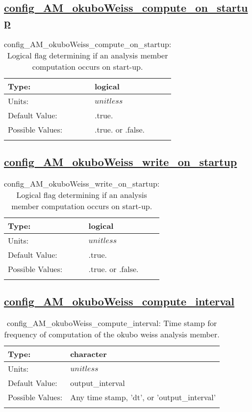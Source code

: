 \subsection[config\_AM\_okuboWeiss\_compute\_on\_startup]{\hyperref[sec:nm_tab_AM_okuboWeiss]{config\_AM\_okuboWeiss\_compute\_on\_startup}}
\label{subsec:nm_sec_config_AM_okuboWeiss_compute_on_startup}
\begin{center}
\begin{longtable}{| p{2.0in} || p{4.0in} |}
    \hline
    Type: & logical \\
    \hline
    Units: & $unitless$ \\
    \hline
    Default Value: & .true. \\
    \hline
    Possible Values: & .true. or .false. \\
    \hline
    \caption{config\_AM\_okuboWeiss\_compute\_on\_startup: Logical flag determining if an analysis member computation occurs on start-up.}
\end{longtable}
\end{center}
\subsection[config\_AM\_okuboWeiss\_write\_on\_startup]{\hyperref[sec:nm_tab_AM_okuboWeiss]{config\_AM\_okuboWeiss\_write\_on\_startup}}
\label{subsec:nm_sec_config_AM_okuboWeiss_write_on_startup}
\begin{center}
\begin{longtable}{| p{2.0in} || p{4.0in} |}
    \hline
    Type: & logical \\
    \hline
    Units: & $unitless$ \\
    \hline
    Default Value: & .true. \\
    \hline
    Possible Values: & .true. or .false. \\
    \hline
    \caption{config\_AM\_okuboWeiss\_write\_on\_startup: Logical flag determining if an analysis member computation occurs on start-up.}
\end{longtable}
\end{center}
\subsection[config\_AM\_okuboWeiss\_compute\_interval]{\hyperref[sec:nm_tab_AM_okuboWeiss]{config\_AM\_okuboWeiss\_compute\_interval}}
\label{subsec:nm_sec_config_AM_okuboWeiss_compute_interval}
\begin{center}
\begin{longtable}{| p{2.0in} || p{4.0in} |}
    \hline
    Type: & character \\
    \hline
    Units: & $unitless$ \\
    \hline
    Default Value: & output\_interval \\
    \hline
    Possible Values: & Any time stamp, 'dt', or 'output\_interval' \\
    \hline
    \caption{config\_AM\_okuboWeiss\_compute\_interval: Time stamp for frequency of computation of the okubo weiss analysis member.}
\end{longtable}
\end{center}
